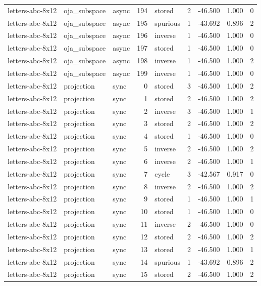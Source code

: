 \begin{tabular}{lllrlrrrr}
letters-abc-8x12 & oja\_subspace & async & 194 & stored & 2 & -46.500 & 1.000 & 0 \\
letters-abc-8x12 & oja\_subspace & async & 195 & spurious & 1 & -43.692 & 0.896 & 2 \\
letters-abc-8x12 & oja\_subspace & async & 196 & inverse & 1 & -46.500 & 1.000 & 0 \\
letters-abc-8x12 & oja\_subspace & async & 197 & stored & 1 & -46.500 & 1.000 & 0 \\
letters-abc-8x12 & oja\_subspace & async & 198 & inverse & 1 & -46.500 & 1.000 & 2 \\
letters-abc-8x12 & oja\_subspace & async & 199 & inverse & 1 & -46.500 & 1.000 & 0 \\
letters-abc-8x12 & projection & sync & 0 & stored & 3 & -46.500 & 1.000 & 2 \\
letters-abc-8x12 & projection & sync & 1 & stored & 2 & -46.500 & 1.000 & 2 \\
letters-abc-8x12 & projection & sync & 2 & inverse & 3 & -46.500 & 1.000 & 1 \\
letters-abc-8x12 & projection & sync & 3 & stored & 2 & -46.500 & 1.000 & 2 \\
letters-abc-8x12 & projection & sync & 4 & stored & 1 & -46.500 & 1.000 & 0 \\
letters-abc-8x12 & projection & sync & 5 & inverse & 2 & -46.500 & 1.000 & 2 \\
letters-abc-8x12 & projection & sync & 6 & inverse & 2 & -46.500 & 1.000 & 1 \\
letters-abc-8x12 & projection & sync & 7 & cycle & 3 & -42.567 & 0.917 & 0 \\
letters-abc-8x12 & projection & sync & 8 & inverse & 2 & -46.500 & 1.000 & 2 \\
letters-abc-8x12 & projection & sync & 9 & stored & 1 & -46.500 & 1.000 & 1 \\
letters-abc-8x12 & projection & sync & 10 & stored & 1 & -46.500 & 1.000 & 0 \\
letters-abc-8x12 & projection & sync & 11 & inverse & 2 & -46.500 & 1.000 & 0 \\
letters-abc-8x12 & projection & sync & 12 & stored & 2 & -46.500 & 1.000 & 2 \\
letters-abc-8x12 & projection & sync & 13 & stored & 2 & -46.500 & 1.000 & 1 \\
letters-abc-8x12 & projection & sync & 14 & spurious & 1 & -43.692 & 0.896 & 2 \\
letters-abc-8x12 & projection & sync & 15 & stored & 2 & -46.500 & 1.000 & 2 \\

\end{tabular}
